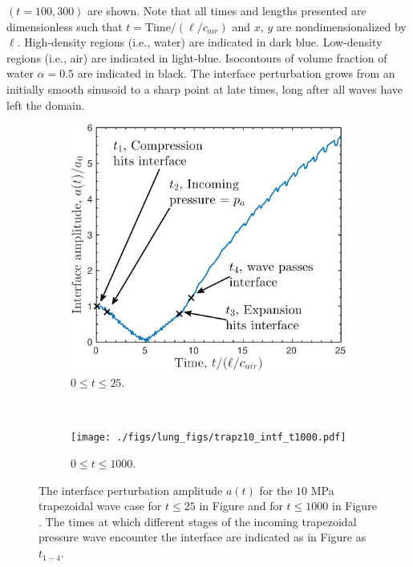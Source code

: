 \documentclass{jfm}%
\begin{document}
$(t=100, 300)$ are shown. Note that all times and lengths presented are
dimensionless such that $t = \text{Time}/\left(\ell/c_{air}\right)$ and $x$,
$y$ are nondimensionalized by $\ell$. High-density regions (i.e.,
water) are indicated in dark blue. Low-density regions (i.e., air) are
indicated in light-blue. Isocontours of volume fraction of water
$\alpha=0.5$ are indicated in black. The interface
perturbation grows from an initially smooth sinusoid to a sharp point
at late times, long after all waves have left the domain.
% 
\begin{figure} 
  \centering
  \begin{subfigure}[b]{0.45\textwidth}
    \centering
    \includegraphics[width=\textwidth]{./figs/lung_figs/trapz10_intf_schematic.pdf}
    \caption{\label{fig:trapz10_interface25} $0\leq t \leq 25$.}
  \end{subfigure}
  ~
  \begin{subfigure}[b]{0.45\textwidth}
    \centering
    \texttt{[image: ./figs/lung\_figs/trapz10\_intf\_t1000.pdf]}%
    \caption{\label{fig:trapz10_interface1000} $0\leq t \leq 1000$.}
  \end{subfigure}
  \caption[The interface perturbation amplitude history for 10 MPa
  trapezoidal wave]{The interface perturbation amplitude $a(t)$ for
    the $10$ MPa trapezoidal wave case for $t\leq25$ in Figure \protect{} and for
    $t\leq1000$ in Figure \protect{}. The times at which different stages of the
    incoming trapezoidal pressure wave encounter the interface are
    indicated as in Figure \protect{} as $t_{1-4}$.}
  \label{fig:trapz10_interface}
\end{figure}\par
\end{document}
